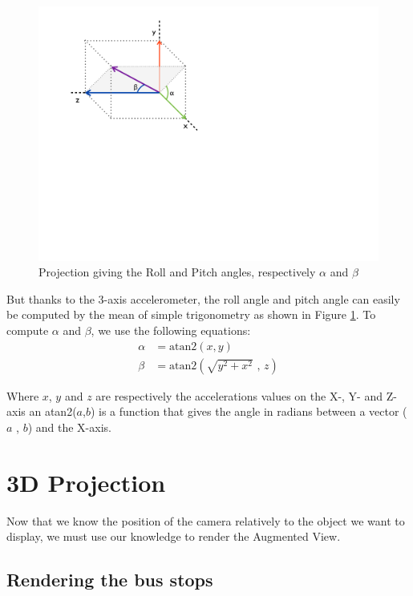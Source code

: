 \begin{figure}[ht]
\center
\includegraphics[scale=0.5]{pics/six_degrees_angles}
\caption{Projection giving the Roll and Pitch angles, respectively $\alpha$ and $\beta$}
\label{fig:six_degrees_angles}
\end{figure}

\clearpage

But thanks to the 3-axis accelerometer, the roll angle and pitch angle can easily be computed by the mean of simple trigonometry as shown in Figure \ref{fig:six_degrees_angles}. To compute $\alpha$ and $\beta$, we use the following equations:
\begin{align} 
\alpha 	&= 	\textrm{atan2}(x, y)\\
\beta 	&= 	\textrm{atan2}\left(\sqrt{y^2+x^2}\textrm{ , } z\right)
\end{align}

Where $x$, $y$ and $z$ are respectively the accelerations values on the X-, Y- and Z-axis an atan2($a${},{}$b$) is a function that gives the angle in radians between a vector ($a$ , $b$) and the X-axis.


\section{3D Projection}

Now that we know the position of the camera relatively to the object we want to display, we must use our knowledge to render the Augmented View.

\subsection{Rendering the bus stops}

